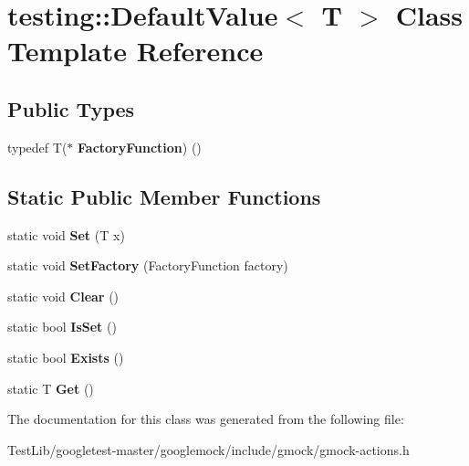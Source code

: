 \hypertarget{classtesting_1_1DefaultValue}{}\section{testing\+:\+:Default\+Value$<$ T $>$ Class Template Reference}
\label{classtesting_1_1DefaultValue}
\subsection*{Public Types}
\begin{DoxyCompactItemize}
\item 
\mbox{\label{classtesting_1_1DefaultValue_a5763a68d75e0a4c97fcaff708e2df803}} 
typedef T($\ast$ {\bfseries Factory\+Function}) ()
\end{DoxyCompactItemize}
\subsection*{Static Public Member Functions}
\begin{DoxyCompactItemize}
\item 
\mbox{\label{classtesting_1_1DefaultValue_a5698814be364b9ac26e72ad37d6ff14e}} 
static void {\bfseries Set} (T x)
\item 
\mbox{\label{classtesting_1_1DefaultValue_af012445ff5b194940c1427529707cb91}} 
static void {\bfseries Set\+Factory} (Factory\+Function factory)
\item 
\mbox{\label{classtesting_1_1DefaultValue_a8163037b60311177cb211f070c512ee3}} 
static void {\bfseries Clear} ()
\item 
\mbox{\label{classtesting_1_1DefaultValue_ad49febe2c944cbbd06451ba7d0366ca1}} 
static bool {\bfseries Is\+Set} ()
\item 
\mbox{\label{classtesting_1_1DefaultValue_aec1ff9b510af7dbb86c837fd2409fd70}} 
static bool {\bfseries Exists} ()
\item 
\mbox{\label{classtesting_1_1DefaultValue_a4dc6dfee4cbc9cdb36f5c9cde5cf2b83}} 
static T {\bfseries Get} ()
\end{DoxyCompactItemize}


The documentation for this class was generated from the following file\+:\begin{DoxyCompactItemize}
\item 
Test\+Lib/googletest-\/master/googlemock/include/gmock/gmock-\/actions.\+h\end{DoxyCompactItemize}
